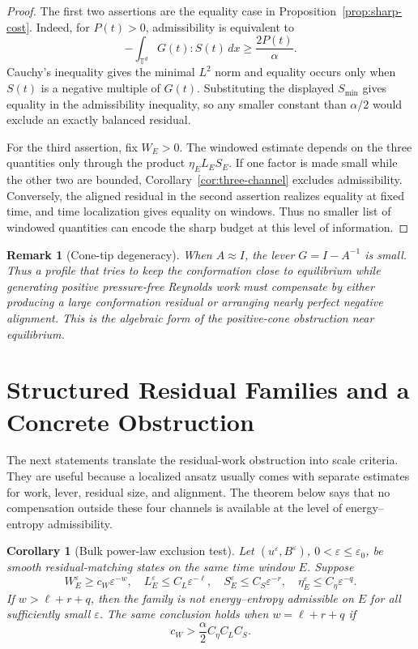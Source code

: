 \documentclass[11pt]{article}
\numberwithin{equation}{section}
\newtheorem{corollary}[theorem]{Corollary}
\newtheorem{remark}[theorem]{Remark}
\newcommand{\T}{\mathbb T}
\newcommand{\Id}{I}
\begin{document}
\begin{proof}
The first two assertions are the equality case in
Proposition~\ref{prop:sharp-cost}.  Indeed, for \(P(t)>0\), admissibility is
equivalent to
\[
  -\int_{\T^d}G(t):S(t)\,dx\ge \frac{2P(t)}{\alpha}.
\]
Cauchy's inequality gives the minimal \(L^2\) norm and equality occurs only
when \(S(t)\) is a negative multiple of \(G(t)\).  Substituting the displayed
\(S_{\min}\) gives equality in the admissibility inequality, so any smaller
constant than \(\alpha/2\) would exclude an exactly balanced residual.

For the third assertion, fix \(W_E>0\).  The windowed estimate depends on the
three quantities only through the product \(\eta_E L_E S_E\).  If one factor is
made small while the other two are bounded, Corollary~\ref{cor:three-channel}
excludes admissibility.  Conversely, the aligned residual in the second
assertion realizes equality at fixed time, and time localization gives equality
on windows.  Thus no smaller list of windowed quantities can encode the sharp
budget at this level of information.
\end{proof}

\begin{remark}[Cone-tip degeneracy]
When \(A\approx\Id\), the lever \(G=\Id-A^{-1}\) is small.  Thus a profile that
tries to keep the conformation close to equilibrium while generating positive
pressure-free Reynolds work must compensate by either producing a large
conformation residual or arranging nearly perfect negative alignment.  This is
the algebraic form of the positive-cone obstruction near equilibrium.
\end{remark}

\section{Structured Residual Families and a Concrete Obstruction}
\label{sec:application}

The next statements translate the residual-work obstruction into scale
criteria.  They are useful because a localized ansatz usually comes with
separate estimates for work, lever, residual size, and alignment.  The theorem
below says that no compensation outside these four channels is available at the
level of energy--entropy admissibility.

\begin{corollary}[Bulk power-law exclusion test]
\label{cor:bulk-power-law}
Let \((u^\varepsilon,B^\varepsilon)\), \(0<\varepsilon\le\varepsilon_0\), be
smooth residual-matching states on the same time window \(E\).  Suppose
\[
  W_E^\varepsilon\ge c_W\varepsilon^{-w},\quad
  L_E^\varepsilon\le C_L\varepsilon^{-\ell},\quad
  S_E^\varepsilon\le C_S\varepsilon^{-r},\quad
  \eta_E^\varepsilon\le C_\eta\varepsilon^{-q}.
  \label{eq:bulk-powers}
\]
If \(w>\ell+r+q\), then the family is not energy--entropy admissible on \(E\)
for all sufficiently small \(\varepsilon\).  The same conclusion holds when
\(w=\ell+r+q\) if
\[
  c_W>\frac{\alpha}{2}C_\eta C_LC_S .
\]
\end{corollary}
\end{document}
